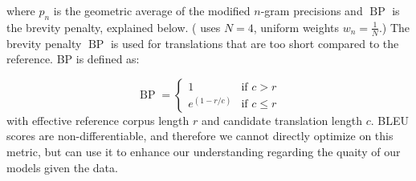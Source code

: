 \documentclass[twoside,twocolumn]{article}
\newlength\mystoreparindent
\newenvironment{myparindent}[1]{%
  \setlength{\mystoreparindent}{\the\parindent}
  \setlength{\parindent}{#1}
  }{%
  \setlength{\parindent}{\mystoreparindent}
}
\begin{document}
\begin{myparindent}{0pt}
\noindent
where $p_n$ is the geometric average of the modified $n$-gram precisions
and $\operatorname{BP}$ is the brevity penalty, explained below.
(\cite{papineni2002bleu} uses $N=4$, uniform weights $w_n = \frac{1}{N}$.)
The brevity penalty $\operatorname{BP}$ is used for translations that are
too short compared to the reference. BP is defined as:

\begin{equation}
  \operatorname{BP} = \begin{cases}
    1 & \text{if } c > r \\
    e^{(1-r/c)} & \text{if } c \leq r
  \end{cases}
\end{equation}
\noindent
with effective reference corpus length $r$ and candidate translation length $c$.
BLEU scores are non-differentiable, and therefore we cannot directly optimize
on this metric, but can use it to enhance our understanding regarding the
quaity of our models given the data.


\end{myparindent}
\end{document}
